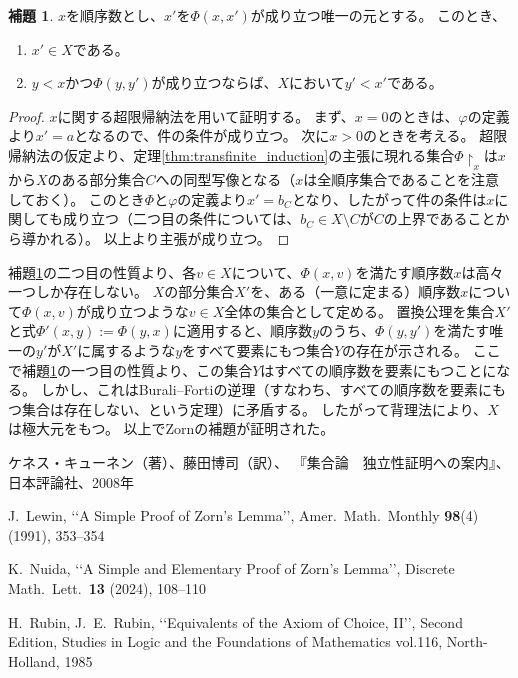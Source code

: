 ﻿\documentclass{ltjsarticle}
\theoremstyle{definition}
\newtheorem{lemma}{補題}
\begin{document}
\begin{lemma}
    \label{lem:appendix_property_of_Phi}
    $x$を順序数とし、$x'$を$\Phi(x,x')$が成り立つ唯一の元とする。
    このとき、
    \begin{enumerate}
        \item $x' \in X$である。
        \item $y < x$かつ$\Phi(y,y')$が成り立つならば、$X$において$y' < x'$である。
    \end{enumerate}
\end{lemma}
\begin{proof}
    $x$に関する超限帰納法を用いて証明する。
    まず、$x = 0$のときは、$\varphi$の定義より$x' = a$となるので、件の条件が成り立つ。
    次に$x > 0$のときを考える。
    超限帰納法の仮定より、定理\ref{thm:transfinite_induction}の主張に現れる集合$\Phi\!\upharpoonright_x$は$x$から$X$のある部分集合$C$への同型写像となる（$x$は全順序集合であることを注意しておく）。
    このとき$\Phi$と$\varphi$の定義より$x' = b_C$となり、したがって件の条件は$x$に関しても成り立つ（二つ目の条件については、$b_C \in X \setminus C$が$C$の上界であることから導かれる）。
    以上より主張が成り立つ。
\end{proof}

補題\ref{lem:appendix_property_of_Phi}の二つ目の性質より、各$v \in X$について、$\Phi(x,v)$を満たす順序数$x$は高々一つしか存在しない。
$X$の部分集合$X'$を、ある（一意に定まる）順序数$x$について$\Phi(x,v)$が成り立つような$v \in X$全体の集合として定める。
置換公理を集合$X'$と式$\Phi'(x,y) := \Phi(y,x)$に適用すると、順序数$y$のうち、$\Phi(y,y')$を満たす唯一の$y'$が$X'$に属するような$y$をすべて要素にもつ集合$Y$の存在が示される。
ここで補題\ref{lem:appendix_property_of_Phi}の一つ目の性質より、この集合$Y$はすべての順序数を要素にもつことになる。
しかし、これはBurali--Fortiの逆理（すなわち、すべての順序数を要素にもつ集合は存在しない、という定理）に矛盾する。
したがって背理法により、$X$は極大元をもつ。
以上でZornの補題が証明された。

\begin{thebibliography}{9}

    ケネス・キューネン（著）、藤田博司（訳）、
    『集合論　独立性証明への案内』、
    日本評論社、2008年

    J.~Lewin,
    \lq\lq A Simple Proof of Zorn's Lemma\rq\rq,
    Amer.\ Math.\ Monthly \textbf{98}(4) (1991),
    353--354

    K.~Nuida,
    \lq\lq A Simple and Elementary Proof of Zorn's Lemma\rq\rq,
    Discrete Math.\ Lett.\ \textbf{13} (2024), 108--110

    H.~Rubin, J.~E.~Rubin, 
    \lq\lq Equivalents of the Axiom of Choice, II\rq\rq, Second Edition, 
    Studies in Logic and the Foundations of Mathematics vol.116, North-Holland, 1985

\end{thebibliography}
\end{document}
